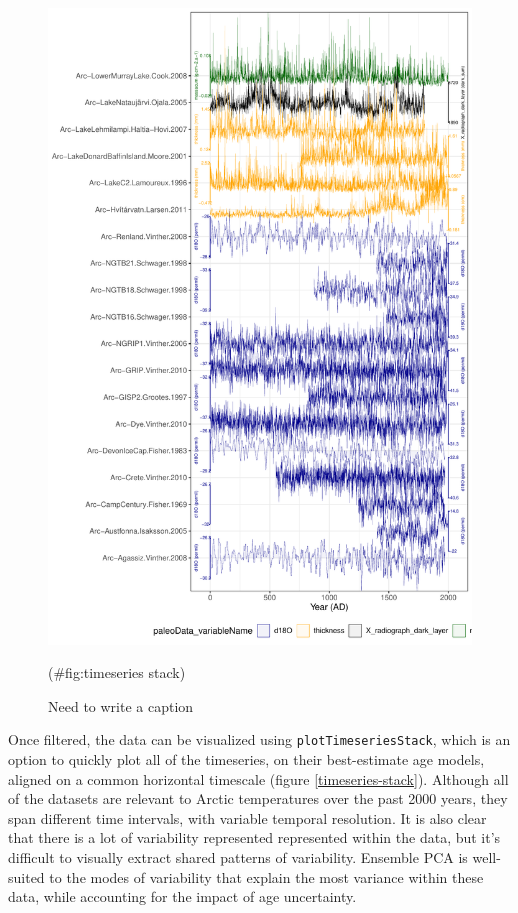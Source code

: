 \documentclass[gchron, manuscript]{copernicus}
\begin{document}
\begin{figure}
\includegraphics[width=12cm]{geoChronR-paper_files/figure-latex/timeseries stack-1} \caption{Need to write a caption}(\#fig:timeseries stack)
\end{figure}

Once filtered, the data can be visualized using \texttt{plotTimeseriesStack}, which is an option to quickly plot all of the timeseries, on their best-estimate age models, aligned on a common horizontal timescale (figure \ref{timeseries-stack}).
Although all of the datasets are relevant to Arctic temperatures over the past 2000 years, they span different time intervals, with variable temporal resolution.
It is also clear that there is a lot of variability represented represented within the data, but it's difficult to visually extract shared patterns of variability.
Ensemble PCA is well-suited to the modes of variability that explain the most variance within these data, while accounting for the impact of age uncertainty.
\end{document}

